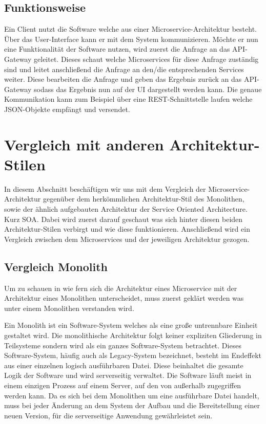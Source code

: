 \section{Funktionsweise}\label{sec:funktion}

Ein Client nutzt die Software welche aus einer Microservice-Architektur besteht. Über das User-Interface kann er mit dem System kommunizieren. Möchte er nun eine Funktionalität der Software nutzen, wird zuerst die Anfrage an das API-Gateway geleitet. Dieses schaut welche Microservices für diese Anfrage zuständig sind und leitet anschließend die Anfrage an den/die entsprechenden Services weiter. Diese bearbeiten die Anfrage und geben das Ergebnis zurück an das API-Gateway sodass das Ergebnis nun auf der UI dargestellt werden kann. Die genaue Kommunikation kann zum Beispiel über eine REST-Schnittstelle laufen welche JSON-Objekte empfängt und versendet.

\chapter{Vergleich mit anderen Architektur-Stilen}

In diesem Abschnitt beschäftigen wir uns mit dem Vergleich der Microservice-Architektur gegenüber dem herkömmlichen Architektur-Stil des Monolithen, sowie der ähnlich aufgebauten Architektur der Service Oriented Architecture. Kurz SOA.
Dabei wird zuerst darauf geschaut was sich hinter diesen beiden Architektur-Stilen verbirgt und wie diese funktionieren. Anschließend wird ein Vergleich zwischen dem Microservices und der jeweiligen Architektur gezogen.

\section{Vergleich Monolith}

Um zu schauen in wie fern sich die Architektur eines Microservice mit der Architektur eines Monolithen unterscheidet, muss zuerst geklärt werden was unter einem Monolithen verstanden wird.\newline\newline

Ein Monolith ist ein Software-System welches als eine große untrennbare Einheit gestaltet wird. Die monolithische Architektur folgt keiner expliziten Gliederung in Teilsysteme sondern wird als ein ganzes Software-System betrachtet.\cite{monolith}
Dieses Software-System, häufig auch als Legacy-System bezeichnet, besteht im Endeffekt aus einer  einzelnen logisch ausführbaren Datei. Diese beinhaltet die gesamte Logik der Software und wird serverseitig verwaltet. Die Software läuft meist in einem einzigen Prozess auf einem Server, auf den von außerhalb zugegriffen werden kann. 
Da es sich bei dem Monolithen um eine ausführbare Datei handelt, muss bei jeder Änderung an dem System der Aufbau und die Bereitstellung einer neuen Version, für die serverseitige Anwendung gewährleistet sein.\cite{fowlerlewis}


